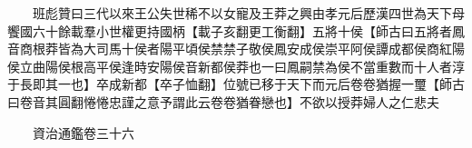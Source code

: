 　　班彪贊曰三代以來王公失世稀不以女寵及王莽之興由孝元后歷漢四世為天下母饗國六十餘載羣小世權更持國柄【載子亥翻更工衡翻】五將十侯【師古曰五將者鳳音商根莽皆為大司馬十侯者陽平頃侯禁禁子敬侯鳳安成侯崇平阿侯譚成都侯商紅陽侯立曲陽侯根高平侯逢時安陽侯音新都侯莽也一曰鳳嗣禁為侯不當重數而十人者淳于長即其一也】卒成新都【卒子恤翻】位號已移于天下而元后卷卷猶握一璽【師古曰卷音其圓翻惓惓忠謹之意予謂此云卷卷猶眷戀也】不欲以授莽婦人之仁悲夫

　　資治通鑑卷三十六


    


 


 



 

 
  







 


　　
　　
　
　
　


　　

　















	
	









































 
  



















 





 












  
  
  

 





